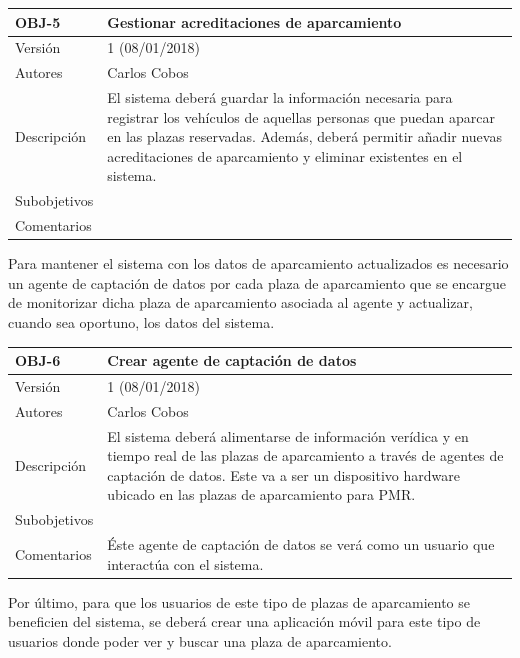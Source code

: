 \begin{tabularx}{\textwidth}{|l|X|}
	\caption{Objetivo 5 del sistema}\label{OBJ-5}\\
	\hline
	OBJ-5        & Gestionar acreditaciones de aparcamiento \\ \hline
	Versión      & 1 (08/01/2018) \\ \hline
	Autores      & Carlos Cobos \\ \hline
	Descripción  & El sistema deberá guardar la información necesaria para registrar los vehículos de aquellas personas que puedan aparcar en las plazas reservadas. Además, deberá permitir añadir nuevas acreditaciones de aparcamiento y eliminar existentes en el sistema. \\ \hline
	Subobjetivos & \\ \hline
	Comentarios  & \\ \hline
\end{tabularx}
Para mantener el sistema con los datos de aparcamiento actualizados es necesario un agente de captación de datos por cada plaza de aparcamiento que se encargue de monitorizar dicha plaza de aparcamiento asociada al agente y actualizar, cuando sea oportuno, los datos del sistema.
\newpage
\begin{tabularx}{\textwidth}{|l|X|}
	\caption{Objetivo 6 del sistema}\label{OBJ-6}\\
	\hline
	OBJ-6        & Crear agente de captación de datos \\ \hline
	Versión      & 1 (08/01/2018) \\ \hline
	Autores      & Carlos Cobos \\ \hline
	Descripción  & El sistema deberá alimentarse de información verídica y en tiempo real de las plazas de aparcamiento a través de agentes de captación de datos. Este va a ser un dispositivo hardware ubicado en las plazas de aparcamiento para PMR. \\ \hline
	Subobjetivos & \\ \hline
	Comentarios  & Éste agente de captación de datos se verá como un usuario que interactúa con el sistema. \\ \hline
\end{tabularx}
Por último, para que los usuarios de este tipo de plazas de aparcamiento se beneficien del sistema, se deberá crear una aplicación móvil para este tipo de usuarios donde poder ver y buscar una plaza de aparcamiento.
